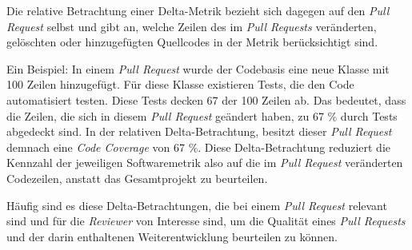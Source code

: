 Die relative Betrachtung einer Delta-Metrik bezieht sich dagegen auf den \textit{Pull Request} selbst und gibt an, welche Zeilen des im \textit{Pull Requests} veränderten, gelöschten oder hinzugefügten Quellcodes in der Metrik berücksichtigt sind. 

Ein Beispiel: In einem \textit{Pull Request} wurde der Codebasis eine neue Klasse mit 100 Zeilen hinzugefügt. Für diese Klasse existieren Tests, die den Code automatisiert testen. Diese Tests decken 67 der 100 Zeilen ab. Das bedeutet, dass die Zeilen, die sich in diesem \textit{Pull Request} geändert haben, zu 67 \% durch Tests abgedeckt sind. In der relativen Delta-Betrachtung, besitzt dieser \textit{Pull Request} demnach eine \textit{Code Coverage} von 67 \%. Diese Delta-Betrachtung reduziert die Kennzahl der jeweiligen Softwaremetrik also auf die im \textit{Pull Request} veränderten Codezeilen, anstatt das Gesamtprojekt zu beurteilen. 

Häufig sind es diese Delta-Betrachtungen, die bei einem \textit{Pull Request} relevant sind und für die \textit{Reviewer} von Interesse sind, um die Qualität eines \textit{Pull Requests} und der darin enthaltenen Weiterentwicklung beurteilen zu können. 


